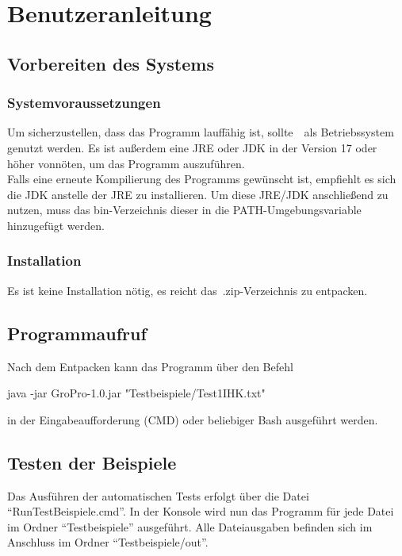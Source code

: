\chapter{Benutzeranleitung}\label{ch:benutzeranleitung}


\section{Vorbereiten des Systems}\label{sec:vorbereiten-des-systems}

\subsection{Systemvoraussetzungen}\label{subsec:systemvoraussetzungen}
Um sicherzustellen, dass das Programm lauffähig ist, sollte~\Betriebssystem~als Betriebssystem genutzt werden.
Es ist außerdem eine JRE oder JDK in der Version 17 oder höher vonnöten, um das Programm auszuführen.\\
Falls eine erneute Kompilierung des Programms gewünscht ist, empfiehlt es sich die JDK anstelle der JRE zu installieren.
Um diese JRE/JDK anschließend zu nutzen, muss das bin-Verzeichnis dieser in die PATH-Umgebungsvariable hinzugefügt werden.
\subsection{Installation}\label{subsec:installation}
Es ist keine Installation nötig, es reicht das~.zip-Verzeichnis zu entpacken.

\section{Programmaufruf}\label{sec:programmaufruf}
Nach dem Entpacken kann das Programm über den Befehl
\begin{center}
    \colorbox{gray!20}{
        \begin{minipage}{0.9\textwidth}
            java -jar GroPro-1.0.jar "Testbeispiele/Test1IHK.txt"
        \end{minipage}
    }
\end{center}
in der Eingabeaufforderung (CMD) oder beliebiger Bash ausgeführt werden.
\section{Testen der Beispiele}\label{sec:testen-der-beispiele}
Das Ausführen der automatischen Tests erfolgt über die Datei \enquote{RunTestBeispiele.cmd}.
In der Konsole wird nun das Programm für jede Datei im Ordner \enquote{Testbeispiele} ausgeführt.
Alle Dateiausgaben befinden sich im Anschluss im Ordner \enquote{Testbeispiele/out}.

